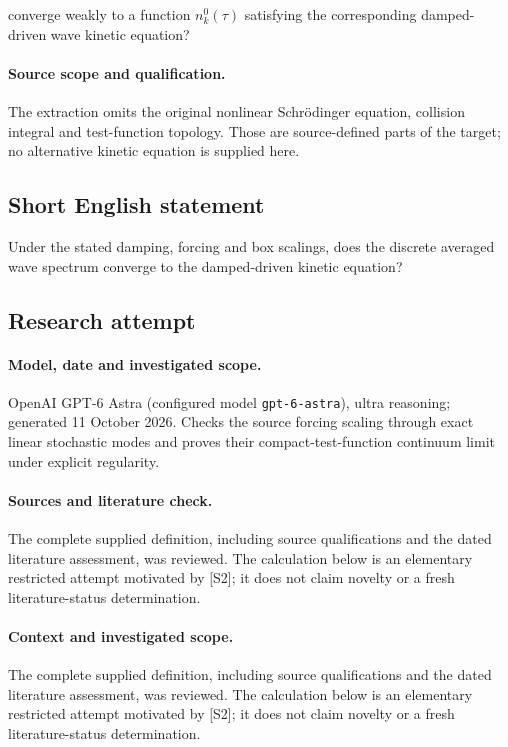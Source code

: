 \documentclass[11pt]{article}
\begin{document}
converge weakly to a function $n_k^0(\tau)$ satisfying the corresponding damped-driven wave kinetic equation?

\paragraph{Source scope and qualification.}
The extraction omits the original nonlinear Schrödinger equation, collision integral and test-function topology. Those are source-defined parts of the target; no alternative kinetic equation is supplied here.
\subsection{Short English statement}
Under the stated damping, forcing and box scalings, does the discrete averaged wave spectrum converge to the damped-driven kinetic equation?
\subsection{Research attempt}
\paragraph{Model, date and investigated scope.}
OpenAI GPT-6 Astra (configured model \texttt{gpt-6-astra}), ultra reasoning; generated 11 October 2026. Checks the source forcing scaling through exact linear stochastic modes and proves their compact-test-function continuum limit under explicit regularity.

\paragraph{Sources and literature check.}
The complete supplied definition, including source qualifications and the dated literature assessment, was reviewed. The calculation below is an elementary restricted attempt motivated by [S2]; it does not claim novelty or a fresh literature-status determination.

\paragraph{Context and investigated scope.} The complete supplied definition, including source qualifications and the dated literature assessment, was reviewed. The calculation below is an elementary restricted attempt motivated by [S2]; it does not claim novelty or a fresh literature-status determination.
\end{document}

